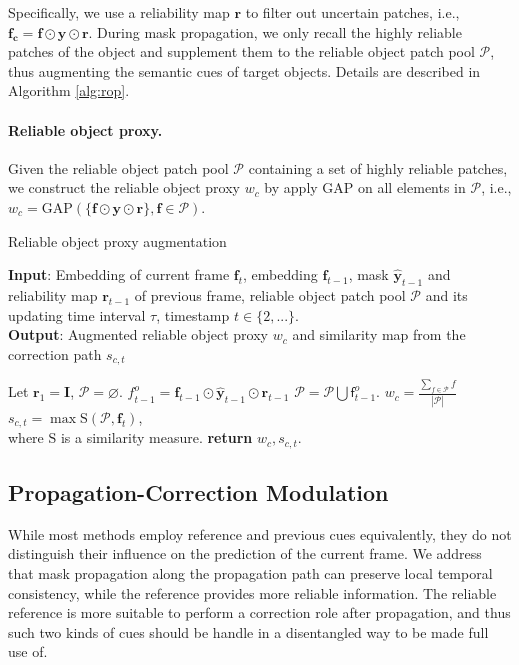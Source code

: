 \documentclass[letterpaper]{article} \usepackage{aaai22}  \usepackage{times}  \usepackage{helvet}  \usepackage{courier}  \usepackage[hyphens]{url}  \usepackage{graphicx} \urlstyle{rm} \def\UrlFont{\rm}  \usepackage{natbib}  \usepackage{caption} \DeclareCaptionStyle{ruled}{labelfont=normalfont,labelsep=colon,strut=off} \frenchspacing  \setlength{\pdfpagewidth}{8.5in}  \setlength{\pdfpageheight}{11in}  \usepackage{algorithm}
\begin{document}
Specifically, we use a reliability map $\mathbf{r}$ to filter out uncertain patches, i.e., $\mathbf{f_c} = \mathbf{f} \odot \mathbf{y} \odot \mathbf{r}$. During mask propagation, we only recall the highly reliable patches of the object and supplement them to the reliable object patch pool $\mathcal{P}$, thus augmenting the semantic cues of target objects. Details are described in Algorithm \ref{alg:rop}.

\paragraph{Reliable object proxy.}
Given the reliable object patch pool $\mathcal{P}$ containing a set of highly reliable patches, we construct the reliable object proxy $w_{c}$ by apply GAP on all elements in $\mathcal{P}$, i.e.,  $w_c=\text{GAP}(\{\mathbf{f} \odot \mathbf{y} \odot \mathbf{r}\}, \mathbf{f} \in \mathcal{P})$.


\begin{algorithm}[tb]
\caption{Reliable object proxy augmentation}
\label{alg:rop}
\textbf{Input}: Embedding of current frame $\mathbf{f}_{t}$, embedding $\mathbf{f}_{t-1}$, mask $\hat{\mathbf{y}}_{t-1}$ and reliability map $\mathbf{r}_{t-1}$ of previous frame, reliable object patch pool $\mathcal{P}$ and its updating time interval $\tau$, timestamp $t \in \{2, ...\}$. \\
\textbf{Output}: Augmented reliable object proxy $w_c$ and similarity map from the correction path $s_{c,t}$ 
\begin{algorithmic}[1] 
\STATE Let $\mathbf{r}_1 = \mathbf{I}$, $\mathcal{P} =  \varnothing$. 
\ENDIF
{}
\STATE $\mathit{f}_{t-1}^o = \mathbf{f}_{t-1} \odot \hat{\mathbf{y}}_{t-1} \odot \mathbf{r}_{t-1}$ 
\STATE $\mathcal{P}=\mathcal{P} \bigcup \mathsf{f}_{t-1}^o$. 
\ENDIF
\STATE $w_c = \frac{\sum_{f \in \mathcal{P} } f }{|\mathcal{P}|} $
\STATE $s_{c,t} = \max \text{S}({\mathcal{P},\mathbf{f}_{t}})$, \\where $\text{S}$ is a similarity measure.
\STATE \textbf{return} $w_c, s_{c,t}$.
\end{algorithmic}
\end{algorithm}
 \subsection{Propagation-Correction Modulation}

While most methods \cite{oh2019video,seong2020kernelized,lu2020video} employ reference and previous cues equivalently, they do not distinguish their influence on the prediction of the current frame. We address that mask propagation along the propagation path can preserve local temporal consistency, while the reference provides more reliable information. The reliable reference is more suitable to perform a correction role after propagation, and thus such two kinds of cues should be handle in a disentangled way to be made full use of.
\end{document}

